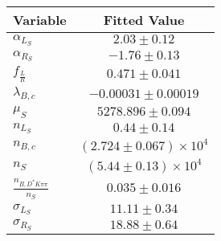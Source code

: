 \begin{tabular}[t]{lc}
\hline
Variable &Fitted Value\\
\hline\hline
$\alpha_{L_S}$&$2.03\pm0.12$\\
\hline
$\alpha_{R_S}$&$-1.76\pm0.13$\\
\hline
$f_{\frac{L}{R}}$&$0.471\pm0.041$\\
\hline
$\lambda_{B,c}$&$-0.00031\pm0.00019$\\
\hline
$\mu_S$&$5278.896\pm0.094$\\
\hline
$n_{L_S}$&$0.44\pm0.14$\\
\hline
$n_{B,c}$&$(2.724\pm0.067)\times 10^4$\\
\hline
$n_S$&$(5.44\pm0.13)\times 10^4$\\
\hline
$\frac{n_{B,D^*K\pi\pi}}{n_S}$&$0.035\pm0.016$\\
\hline
$\sigma_{L_S}$&$11.11\pm0.34$\\
\hline
$\sigma_{R_S}$&$18.88\pm0.64$\\
\hline
\end{tabular}